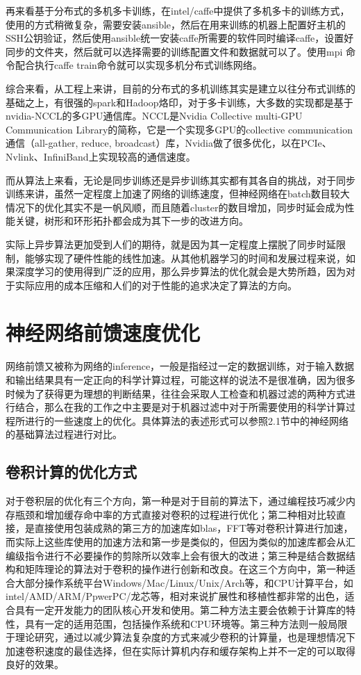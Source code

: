 再来看基于分布式的多机多卡训练，在intel/caffe中提供了多机多卡的训练方式，使用的方式稍微复杂，需要安装ansible，然后在用来训练的机器上配置好主机的SSH公钥验证，然后使用ansible统一安装caffe所需要的软件同时编译caffe，设置好同步的文件夹，然后就可以选择需要的训练配置文件和数据就可以了。使用mpi 命令配合执行caffe train命令就可以实现多机分布式训练网络。

综合来看，从工程上来讲，目前的分布式的多机训练其实是建立以往分布式训练的基础之上，有很强的spark和Hadoop烙印，对于多卡训练，大多数的实现都是基于nvidia-NCCL的多GPU通信库\cite{NCCL}。NCCL是Nvidia Collective multi-GPU Communication Library的简称，它是一个实现多GPU的collective communication通信（all-gather, reduce, broadcast）库，Nvidia做了很多优化，以在PCIe、Nvlink、InfiniBand上实现较高的通信速度。

而从算法上来看，无论是同步训练还是异步训练其实都有其各自的挑战，对于同步训练来讲，虽然一定程度上加速了网络的训练速度，但神经网络在batch数目较大情况下的优化其实不是一帆风顺，而且随着cluster的数目增加，同步时延会成为性能关键，树形和环形拓扑都会成为其下一步的改进方向。

实际上异步算法更加受到人们的期待，就是因为其一定程度上摆脱了同步时延限制，能够实现了硬件性能的线性加速。从其他机器学习的时间和发展过程来说，如果深度学习的使用得到广泛的应用，那么异步算法的优化就会是大势所趋，因为对于实际应用的成本压缩和人们的对于性能的追求决定了算法的方向。

\section{神经网络前馈速度优化}
网络前馈又被称为网络的inference，一般是指经过一定的数据训练，对于输入数据和输出结果具有一定正向的科学计算过程，可能这样的说法不是很准确，因为很多时候为了获得更为理想的判断结果，往往会采取人工检查和机器过滤的两种方式进行结合，那么在我的工作之中主要是对于机器过滤中对于所需要使用的科学计算过程所进行的一些速度上的优化。具体算法的表述形式可以参照2.1节中的神经网络的基础算法过程进行对比。
\subsection{卷积计算的优化方式}
对于卷积层的优化有三个方向，第一种是对于目前的算法下，通过编程技巧减少内存瓶颈和增加缓存命中率的方式直接对卷积的过程进行优化；第二种相对比较直接，是直接使用包装成熟的第三方的加速库如blas，FFT等对卷积计算进行加速，而实际上这些库使用的加速方法和第一步是类似的，但因为类似的加速库都会从汇编级指令进行不必要操作的剪除所以效率上会有很大的改进；第三种是结合数据结构和矩阵理论的算法对于卷积的操作进行创新和改良。在这三个方向中，第一种适合大部分操作系统平台Windows/Mac/Linux/Unix/Arch等，和CPU计算平台，如intel/AMD/ARM/PpwerPC/龙芯等，相对来说扩展性和移植性都非常的出色，适合具有一定开发能力的团队核心开发和使用。第二种方法主要会依赖于计算库的特性，具有一定的适用范围，包括操作系统和CPU环境等。第三种方法则一般局限于理论研究，通过以减少算法复杂度的方式来减少卷积的计算量，也是理想情况下加速卷积速度的最佳选择，但在实际计算机内存和缓存架构上并不一定的可以取得良好的效果。
